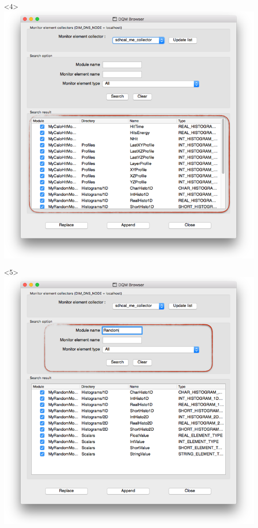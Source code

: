 \documentclass[8pt]{beamer}
\begin{document}
\begin{frame}
\begin{overlayarea}{\textwidth}{\textheight}
\begin{columns}
\begin{center}
         \begin{onlyenv}<4>\includegraphics[width=1.5\textwidth]{figs/Browser/Browser_FullList}\end{onlyenv}
         \begin{onlyenv}<5>\includegraphics[width=1.5\textwidth]{figs/Browser/Browser_Search}\end{onlyenv}

\end{center}
\end{columns}
\end{overlayarea}
\end{frame}
\end{document}
